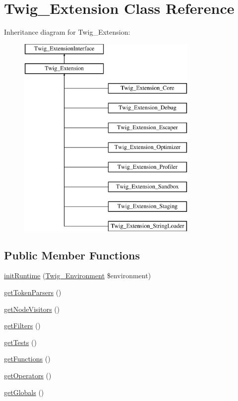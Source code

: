 \hypertarget{class_twig___extension}{}\section{Twig\+\_\+\+Extension Class Reference}
\label{class_twig___extension}
Inheritance diagram for Twig\+\_\+\+Extension\+:\begin{figure}[H]
\begin{center}
\leavevmode
\includegraphics[height=10.000000cm]{class_twig___extension}
\end{center}
\end{figure}
\subsection*{Public Member Functions}
\begin{DoxyCompactItemize}
\item 
\hyperlink{class_twig___extension_ab17a2e5ce3e5789febe1f3a96e61ec38}{init\+Runtime} (\hyperlink{class_twig___environment}{Twig\+\_\+\+Environment} \$environment)
\item 
\hyperlink{class_twig___extension_a8fd35903c3d01c0f0078f59d142eb063}{get\+Token\+Parsers} ()
\item 
\hyperlink{class_twig___extension_aec02093179d390d22ae4083f23a1d74a}{get\+Node\+Visitors} ()
\item 
\hyperlink{class_twig___extension_a428d91319fc73d3038784cf5436936b6}{get\+Filters} ()
\item 
\hyperlink{class_twig___extension_a7e247dd31cc8d37a6c97353a062a0080}{get\+Tests} ()
\item 
\hyperlink{class_twig___extension_a131c2522f07821f77cd1d038c216031b}{get\+Functions} ()
\item 
\hyperlink{class_twig___extension_aeaf58da661970280d00b67c17dc4f8d4}{get\+Operators} ()
\item 
\hyperlink{class_twig___extension_ae3a26252ce6efe503698085a7ed69dad}{get\+Globals} ()
\end{DoxyCompactItemize}


